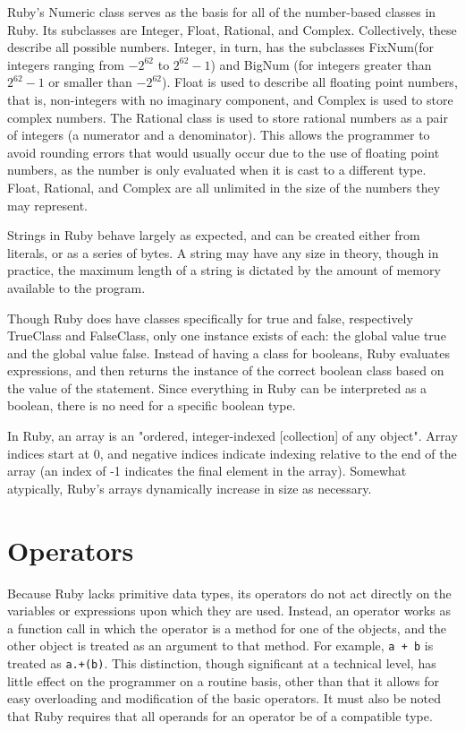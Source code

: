 \documentclass[12pt]{article}
\begin{document}
Ruby's Numeric class serves as the basis for all of the number-based classes in Ruby. Its subclasses are Integer, Float, Rational, and Complex. Collectively, these describe all possible numbers. Integer, in turn, has the subclasses FixNum(for integers ranging from $-2^{62}$ to $2^{62} - 1$) and BigNum (for integers greater than $2^{62}-1$ or smaller than $-2^{62}$). Float is used to describe all floating point numbers, that is, non-integers with no imaginary component, and Complex is used to store complex numbers. The Rational class is used to store rational numbers as a pair of integers (a numerator and a denominator). This allows the programmer to avoid rounding errors that would usually occur due to the use of floating point numbers, as the number is only evaluated when it is cast to a different type. Float, Rational, and Complex are all unlimited in the size of the numbers they may represent\cite{rubydocs}.

Strings in Ruby behave largely as expected, and can be created either from literals, or as a series of bytes. A string may have any size in theory, though in practice, the maximum length of a string is dictated by the amount of memory available to the program.

Though Ruby does have classes specifically for true and false, respectively TrueClass and FalseClass, only one instance exists of each: the global value true and the global value false. Instead of having a class for booleans, Ruby evaluates expressions, and then returns the instance of the correct boolean class based on the value of the statement. Since everything in Ruby can be interpreted as a boolean, there is no need for a specific boolean type\cite{forumbool}.

In Ruby, an array is an "ordered, integer-indexed [collection] of any object"\cite{docsarray}. Array indices start at 0, and negative indices indicate indexing relative to the end of the array (an index of -1 indicates the final element in the array). Somewhat atypically, Ruby's arrays dynamically increase in size as necessary\cite{docsarray}.



\section{Operators}
Because Ruby lacks primitive data types, its operators do not act directly on the variables or expressions upon which they are used. Instead, an operator works as a function call in which the operator is a method for one of the objects, and the other object is treated as an argument to that method. For example, \verb|a + b| is treated as \verb|a.+(b)|. This distinction, though significant at a technical level, has little effect on the programmer on a routine basis, other than that it allows for easy overloading and modification of the basic operators. It must also be noted that Ruby requires that all operands for an operator be of a compatible type\cite{opstut}.
\end{document}
